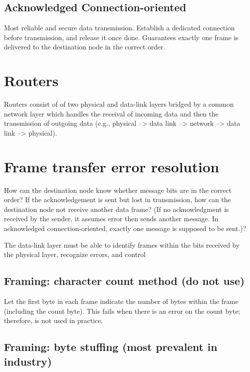 \subsection{Acknowledged Connection-oriented}

Most reliable and secure data transmission. Establish a dedicated connection before transmission, and release it once done. Guarantees exactly one frame is delivered to the destination node in the correct order.

\section{Routers}

Routers consist of of two physical and data-link layers bridged by a common network layer which handles the receival of incoming data and then the transmission of outgoing data (e.g., physical --> data link --> network --> data link --> physical). 

\section{Frame transfer error resolution}

How can the destination node know whether message bits are in the correct order? If the acknowledgement is sent but lost in transmission, how can the destination node not receive another data frame? (If no acknowledgment is received by the sender, it assumes error then sends another message. In acknowledged connection-oriented, exactly one message is supposed to be sent.)?

The data-link layer must be able to identify frames within the bits received by the physical layer, recognize errors, and control 

\subsection{Framing: character count method (do not use)}

Let the first byte in each frame indicate the number of bytes within the frame (including the count byte). This fails when there is an error on the count byte; therefore, is not used in practice.

\subsection{Framing: byte stuffing (most prevalent in industry)}

